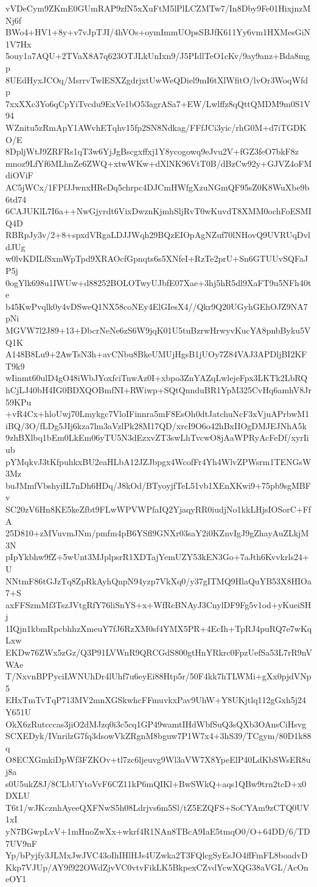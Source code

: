 vVDeCym9ZKmE0GUmRAP9zfN5xXuFtM5lPlLCZMTw7/In8Dby9Fe01HixjnzMNj6f
BWo4+HV1+8y+v7vJpTJI/4hVOs+oymImmUOpsSBJfK611Yy6vm1HXMesGiN1V7Hx
5ouy1a7AQU+2TVaX8A7q623OTJLkUnIxn9/J5PIdlTeO1cKv/9ay9anz+Bda8mgp
8UEdHyxJCOq/MsrrvTwlESXZgdrjxtUwWeQDiel9mI6tXlWfitO/lvOr3WoqWfdp
7xxXXc3Yo6qCpYiTvcdu9ExVe1bO53agrASa7+EW/Lwlffz8qQttQMDM9m0S1V94
WZnitu5zRmApY1AWvhETqhv15fp2SN8Ndkag/FFfJCi3yic/rhG0M+d7iTGDKO/E
8DpljWtJ9ZRFRs1qT3w6YjJgBscgxffxj1Y8ycogowq9eJvu2V+fGZ3feO7bkF8z
mnoz9LfYf6MLhnZe6ZWQ+xtwWKw+dXlNK96VtT0B/dBzCw92y+GJVZ4oFMdiOViF
AC5jWCx/1FPfJJwnxHReDq5chrpc4DJCmHWfgXzuNGmQF95sZ0K8WuXbe9b6td74
6CAJUKlL7I6a++NwGjyrdt6VixDwznKjmhSljRvT0wKuvdT8XMM0ochFoESMIQ4D
RBRpJy3v/2+8+spxdVRgaLDJJWqh29BQzEIOpAgNZuf70lNHovQ9UVRUqDvldJUg
w0lvKDILfSxmWpTpd9XRAOcfGpnqts6s5XNfeI+RzTe2prU+Sn6GTUUvSQFaJP5j
0ogYlk698u1IWUw+d88252BOLOTwyUJbfE07Xae+3hj5hR5dl9XaFT9u5NFh40te
b45KwPvqlk0y4vDSweQ1NX58coNEy4ElGIesX4//Qkr9Q20UGyhGEhOJZ9NA7pNi
MGVW7l2J89+13+DbcrNeNe6zS6W9jqK01U5tuBzrwHrwyvKucYA8pnbByku5VQ1K
A148B8Lu9+2AwTsN3h+avCNbu8BkeUMUjHgsB1jUOy7Z84VAJ3APDljBI2KFT9k9
wIinmt60ulD4gO48iWbJYoxfciTnwAz0I+xbpo3ZnYAZqLwlejeFpx3LKTk2LbRQ
hCjLJ40bH4IG0BDXQOBmfNI+RWiwp+SQtQnnduBR1YpM325CvHq6amhV8Jr59KPu
+vR4Cx+hloUwj70Lmykgc7VloIFinnra5mF8EsOh0dtJatchuNcF3xVjuAPrbwM1
iBQ/3O/fLDg5JIj6kza7lm3aVzlPk28M17QD/xrcI9O6o42hBxIIOgDMJEJNhA5k
9zhBXlbq1bEm0LkEm06yTU5N3dEzxvZT3swLhTvcwO8jAaWPRyAcFeDf/xyrIiub
pYMqkvJ3tKfpuhkxBU2eaHLbA12JZJbpgx4WcofFr4Yh4WlvZPWsrm1TENGsW3Mz
buJMmfVbshyiIL7nDh6HDq/J8kOd/BTyoyjfTeL51vb1XEnXKwi9+75pb9sgMBFv
SC20zV6Hn8KE5keZfbt9FLwWPVWPfaIQ2YjaqyRR0iudjNo1kkLHjsIOSorC+FfA
25D810+zMVuvmJNm/pmfm4pB6YSfl9GNXr03saY2i0KZnvIgJ9gZhayAuZLkjM3N
pIpYkbhw9fZ+5wUnt3MJplpsrR1XDTajYemUZY53kEN3Go+7aJth6Kvvkrls24+U
NNtmF86tGJzTq8ZpRkAyhQnpN94yzp7VkXq0/y37gITMQ9HlaQuYB53X8HIOa7+S
axFFSzmMf3TszJVtgRfY76liSnYS+x+WfRcBNAyJ3CnylDF9Fg5v1od+yKueiSHj
1IQjn1kbmRpcbhhzXmeuY7fJ6RzXM0sf4YMX5PR+4EcIh+TpRJ4puRQ7e7wKqLxw
EKDw76ZWx5zGz/Q3P91LVWnR9QRCGdS800gtHnYRkrc0FpzUefSa53L7rR9nVWAe
T/NxvnBPPyciLWNUhDr4lUhf7u6eyEi88Htp5r/50F4kk7hTLWMi+gXx0pjdVNp5
EHxTmTvTqP713MV2mnXGSkwhcFFmuvkxPav9UhW+Y8UKjtlq112gGxh5j24Y651U
OkX6zRutcccas3jiO2dMJzq0i3c5cq1GP49wamtIHdWbfSuQ3sQXb3OAnsCiHsvg
SCXEDyk/IVnrilzG7fq3dsowVkZRgnM8bguw7P1W7x4+3hS39/TCgym/80D1k88q
O8ECXGmkiDpWf3FZKOv+tl7zc6ljeuvg9Wl3aVW7X8YpeElP40LdKbSWsER8uj8a
s0U5ukZ8J/8CLbUYtoVvF6CZ11kP6mQIKl+BwSWkQ+aqs1QBw9trn2tcD+x0DXLU
T6t1/wJKcznhAyeeQXFNwS5h08Ldrjvs6m5Sl/tZ5EZQFS+SoCYAm9zCTQ0UV1xI
yN7BGwpLvV+1mHnoZwXx+wkrf4R1NAn8TBcA9IaE5tmqO0/O+64DD/6/TD7UV9nF
Yp/bPyjfy3JLMxJwJVC43oIhIHlHJs4UZwka2T3FQlcgSyEsJO4ffFmFL8boadvD
Kkp7VJUp/AY9f922OWdZjvVC0vtvFikLK5BkpexCZvdYcwXQG38aVGL/AcOneOY1
